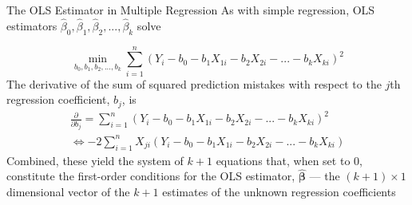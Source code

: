 \documentclass[notes,10pt, aspectratio=169]{beamer}
\begin{document}
\begin{frame}{The OLS Estimator in Multiple Regression}
As with simple regression, OLS estimators $\hat{\beta}_0, \hat{\beta}_1, \hat{\beta}_2, ... , \hat{\beta}_k$ solve

\begin{equation*}
    \min_{b_0, b_1, b_2, ..., b_k} \sum_{i=1}^n (Y_i - b_0 - b_1 X_{1i}- b_2 X_{2i}-...- b_k X_{ki})^2
\end{equation*}
The derivative of the sum of squared prediction mistakes with respect to the $j$th regression coefficient, $b_j$, is
\begin{eqnarray*}
    \frac{\partial}{\partial b_j} = \sum_{i=1}^n (Y_i - b_0 - b_1 X_{1i}- b_2 X_{2i}-...- b_k X_{ki})^2\\
    \Leftrightarrow -2 \sum_{i=1}^n X_{ji} (Y_i - b_0 - b_1 X_{1i}- b_2 X_{2i}-...- b_k X_{ki})
\end{eqnarray*}
Combined, these yield the system of $k+1$ equations that, when set to 0, constitute the first-order conditions for the OLS estimator, $\bm{\hat{\beta}}$ --- the $(k+1)\times1$ dimensional vector of the $k+1$ estimates of the unknown regression coefficients

\end{frame}
\end{document}
